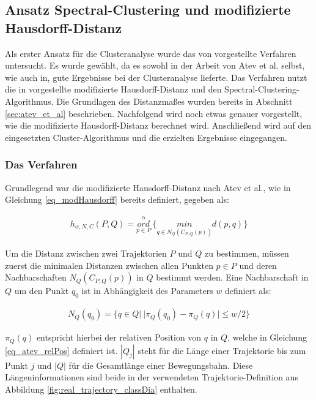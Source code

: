 \subsection{Ansatz Spectral-Clustering und modifizierte Hausdorff-Distanz}
\label{sec:real_ansatz_spec_modHD}

Als erster Ansatz für die Clusteranalyse wurde das von \cite[]{Atev2010} vorgestellte Verfahren untersucht.
Es wurde gewählt, da es sowohl in der Arbeit von Atev et al. selbst, wie auch in\cite[]{Morris2009}, gute Ergebnisse
bei der Clusteranalyse lieferte.
Das Verfahren nutzt die in \cite[]{Atev2006} vorgestellte modifizierte Hausdorff-Distanz und den
Spectral-Clustering-Algorithmus. Die Grundlagen des Distanzmaßes wurden bereits in Abschnitt
\ref{sec:atev_et_al} beschrieben. Nachfolgend wird noch etwas genauer vorgestellt, wie die
modifizierte Hausdorff-Distanz berechnet wird. Anschließend
wird auf den eingesetzten Cluster-Algorithmus und die erzielten Ergebnisse eingegangen.

\subsubsection{Das Verfahren}

Grundlegend war die modifizierte Hausdorff-Distanz nach Atev et al., wie in Gleichung \ref{eq_modHausdorff}
bereits definiert, gegeben als:

\begin{ceqn}
\begin{align*}
    h_{\alpha, N, C}(P, Q) = \overset{\alpha}{\underset{p \in P}{ord}}\ \Big\{ \underset{q \in N_Q(C_{P,Q}(p))}{min} d(p, q) \Big\}
\end{align*}
\end{ceqn}

Um die Distanz zwischen zwei Trajektorien $P$ und $Q$ zu bestimmen, müssen zuerst die minimalen Distanzen
zwischen allen Punkten $p \in P$ und deren Nachbarschaften $N_Q(C_{P,Q}(p))$ in $Q$ bestimmt werden.
Eine Nachbarschaft in $Q$ um den Punkt $q_0$ ist in Abhängigkeit des Parameters $w$ definiert als:

\begin{ceqn}
\begin{align}
    N_Q(q_0) = \{ q \in Q |\ |\pi_Q(q_0) - \pi_Q(q)| \le w/2 \}
\end{align}
\end{ceqn}

$\pi_Q(q)$ entspricht hierbei der relativen Position von $q$ in $Q$, welche in Gleichung \ref{eq_atev_relPos} definiert ist.
$|Q_j|$ steht für die Länge einer Trajektorie bis zum Punkt $j$ und $|Q|$ für die Gesamtlänge einer Bewegungsbahn.
Diese Längeninformationen sind beide in der verwendeten Trajektorie-Definition aus Abbildung
\ref{fig:real_trajectory_classDia} enthalten.

